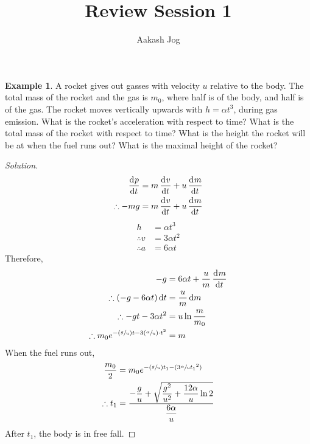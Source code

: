 \documentclass[fleqn, a4paper, 12pt]{article}
\title{Review Session 1}
\author{Aakash Jog}
\date{\formatdate{27}{1}{2015}}
\theoremstyle{definition}
\newtheorem{example}{Example}
\theoremstyle{theorem}
\newenvironment{solution}
{\begin{proof}[Solution]\let\qed\relax}
	{\end{proof}}
\begin{document}
\maketitle

\begin{example}
	A rocket gives out gasses with velocity $u$ relative to the body. The total mass of the rocket and the gas is $m_0$, where half is of the body, and half is of the gas. The rocket moves vertically upwards with $h = \alpha t^3$, during gas emission. What is the rocket's acceleration with respect to time? What is the total mass of the rocket with respect to time? What is the height the rocket will be at when the fuel runs out? What is the maximal height of the rocket?
\end{example}

\begin{solution}
	\begin{align*}
		\dod{p}{t} &= m \dod{v}{t} + u \dod{m}{t}\\
		\therefore -m g &= m \dod{v}{t} + u \dod{m}{t}
	\end{align*}
	\begin{align*}
		h &= \alpha t^3\\
		\therefore v &= 3 \alpha t^2\\
		\therefore a &= 6 \alpha t
	\end{align*}
	Therefore,
	\begin{align*}
		-g &= 6 \alpha t + \dfrac{u}{m} \dod{m}{t}\\
		\therefore \left( - g - 6 \alpha t \right) \dif t &= \dfrac{u}{m} \dif m\\
		\therefore - g t - 3 \alpha t^2 &= u \ln \dfrac{m}{m_0}\\
		\therefore m_0 e^{-(\sfrac{g}{u}) t - 3 (\sfrac{\alpha}{u}) \cdot t^2} &= m
	\end{align*}
	When the fuel runs out,
	\begin{align*}
		\dfrac{m_0}{2} &= m_0 e^{-(\sfrac{g}{u}) t_1 - (3 \sfrac{\alpha}{u} {t_1}^2)}\\
		\therefore t_1 &= \dfrac{-\dfrac{g}{u} + \sqrt{\dfrac{g^2}{u^2} + \dfrac{12 \alpha}{u} \ln 2}}{\dfrac{6 \alpha}{u}}
	\end{align*}
	After $t_1$, the body is in free fall.
\end{solution}
\end{document}
